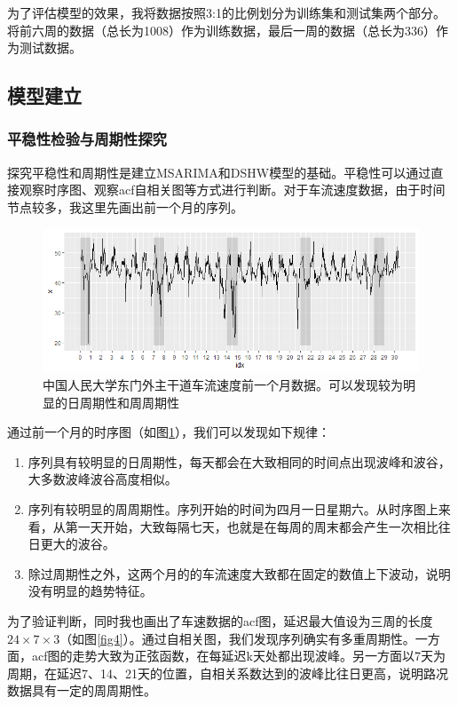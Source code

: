 \documentclass[lang=cn,11pt,a4paper]{elegantpaper}
\begin{document}
为了评估模型的效果，我将数据按照3:1的比例划分为训练集和测试集两个部分。将前六周的数据（总长为1008）作为训练数据，最后一周的数据（总长为336）作为测试数据。

\subsection{模型建立}
\subsubsection{平稳性检验与周期性探究}
探究平稳性和周期性是建立MSARIMA和DSHW模型的基础。平稳性可以通过直接观察时序图、观察acf自相关图等方式进行判断。对于车流速度数据，由于时间节点较多，我这里先画出前一个月的序列。
\begin{figure}[htbp]
  \centering
  \includegraphics[width=\textwidth]{image/first_month.png}
  
  \caption{中国人民大学东门外主干道车流速度前一个月数据。可以发现较为明显的日周期性和周周期性}
\label{fig3}
\end{figure}  

通过前一个月的时序图（如图\ref{fig3}），我们可以发现如下规律：
\begin{enumerate}[(1)]
    \item 序列具有较明显的日周期性，每天都会在大致相同的时间点出现波峰和波谷，大多数波峰波谷高度相似。
    \item 序列有较明显的周周期性。序列开始的时间为四月一日星期六。从时序图上来看，从第一天开始，大致每隔七天，也就是在每周的周末都会产生一次相比往日更大的波谷。
    \item 除过周期性之外，这两个月的的车流速度大致都在固定的数值上下波动，说明没有明显的趋势特征。
\end{enumerate}

为了验证判断，同时我也画出了车速数据的acf图，延迟最大值设为三周的长度$24\times7\times3$（如图\ref{fig4}）。通过自相关图，我们发现序列确实有多重周期性。一方面，acf图的走势大致为正弦函数，在每延迟k天处都出现波峰。另一方面以7天为周期，在延迟7、14、21天的位置，自相关系数达到的波峰比往日更高，说明路况数据具有一定的周周期性。
\end{document}
